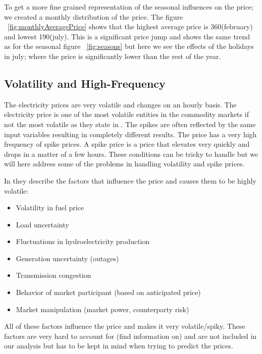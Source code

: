 To get a more fine grained representation of the seasonal influences on the price; we created a monthly distribution of the price. The figure ~\ref{fig:monthlyAveragePrice} shows that the highest average price is 360(february) and lowest 190(july). This is a significant price jump and shows the same trend as for the seasonal figure ~\ref{fig:seasons} but here we see the effects of the holidays in july; where the price is significantly lower than the rest of the year.

\subsection{Volatility and High-Frequency}
\label{sec:volatility}
The electricity prices are very volatile and changes on an hourly basis. The electricity price is one of the most volatile entities in the commodity markets \cite{pjmForecast} if not the most volatile as they state in \cite{yamin2004adaptive}. The spikes are often reflected by the same input variables resulting in completely different results. The price has a very high frequency of spike prices. A spike price is a price that elevates very quickly and drops in a matter of a few hours. These conditions can be tricky to handle but we will here address some of the problems in handling volatility and spike prices.

In \cite{singhal2011electricity} they describe the factors that influence the price and causes them to be highly volatile:
\begin{itemize}
	\item Volatility in fuel price
 	\item Load uncertainty
 	\item Fluctuations in hydroelectricity production
 	\item Generation uncertainty (outages)
 	\item Transmission congestion
 	\item Behavior of market participant (based on anticipated price)
 	\item Market manipulation (market power, counterparty risk)
\end{itemize}
All of these factors influence the price and makes it very volatile/spiky. These factors are very hard to account for (find information on) and are not included in our analysis but has to be kept in mind when trying to predict the prices. 

